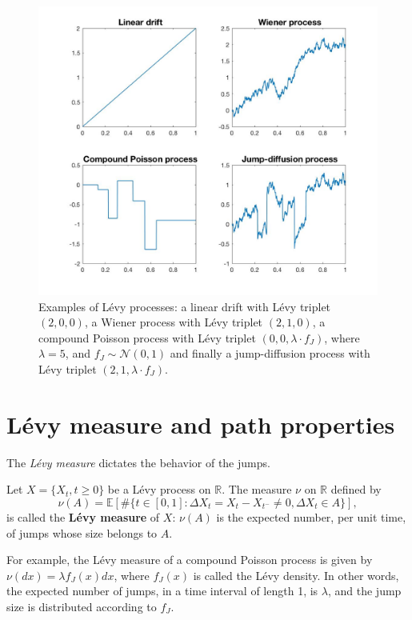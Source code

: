 \begin{figure}[!htb]
	\includegraphics[width=\textwidth]{gfx/processes_examples}
	\caption{Examples of L\'evy processes: a linear drift with L\'evy triplet $(2,0,0)$, a Wiener process with L\'evy triplet $(2,1,0)$, a compound Poisson process with L\'evy triplet $(0,0,\lambda\cdot f_J)$, where $\lambda = 5$, and $f_J\sim\mathcal{N}(0,1)$ and finally a jump-diffusion process with L\'evy triplet $(2,1,\lambda\cdot f_J)$.}
	\label{fig:Levy:examples}
\end{figure}

\section{L\'evy measure and path properties}
\label{sec:Levy:Levy_measure}
The \textit{L\'evy measure} dictates the behavior of the jumps.
\begin{defn}
Let $X = \{X_t,t\geq 0\}$ be a L\'evy process on $\mathbb{R}$. The measure $\nu$ on $\mathbb{R}$ defined by
$$\nu(A) = \mathbb{E}\left[\#\{t\in[0,1]:\Delta X_t = X_t-X_{t^-} \neq 0, \Delta X_t\in A\}\right],$$
is called the \textbf{L\'evy measure} of $X$: $\nu(A)$ is the expected number, per unit time, of jumps whose size belongs to $A$.
\end{defn}

For example, the L\'evy measure of a compound Poisson process is given by $\nu(dx) = \lambda f_J(x)dx$, where $f_J(x)$ is called the L\'evy density. In other words, the expected number of jumps, in a time interval of length 1, is $\lambda$, and the jump size is distributed according to $f_J$.

